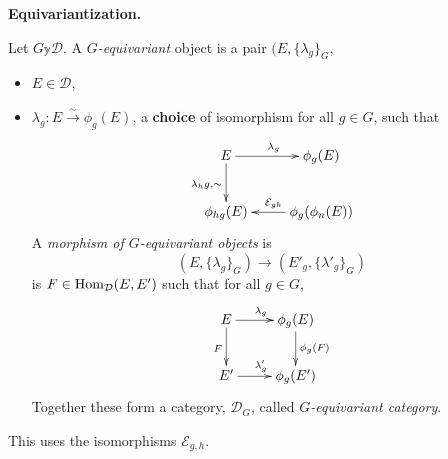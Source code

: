 \medskip\noindent
{\bf Equivariantization.}

\begin{definition}
\label{definition-G-equivariant-object}
Let $G \mathbb{y}\mathcal{D}$. A {\it
$G$-equivariant} object is a pair
$(E,\{\lambda_g\}_G$,
\begin{itemize}
\item $E \in \mathcal{D}$,
\item $\lambda_g:E
\xrightarrow{\sim}\phi_g(E)$, a {\bf choice}
of isomorphism
for all $g\in G$, such that
$$
\xymatrix{
E\ar[r]^{\lambda_g}\ar[d]_{\lambda_hg,\sim}&
\phi_g(E)\\
\phi_{hg}(E)&\phi_g(\phi_n(E))\ar[l]
_{\mathcal{E}_{gh}}
}
$$
A {\it morphism of $G$-equivariant objects}
is
$$
(E,\{\lambda_g\}_G)\to(E'_g,\{\lambda'_g\}_G)
$$
is $F \in \mathop{\mathrm{Hom}}\nolimits_\mathcal{D}(E,E')$ such that
for all $g \in G$,
$$
\xymatrix{
E\ar[d]_F\ar[r]^{\lambda_g}&\phi_g(E)\ar[d]
^{\phi_g(F)}\\
E'\ar[r]^{\lambda'_g}&\phi_g(E')
}
$$
Together these form a category,
$\mathcal{D}_G$, called {\it $G$-equivariant
category}.
\end{itemize}
\end{definition}

\begin{remark}
\label{remark-uses-isomorphisms-Egh}
This uses the isomorphisms
$\mathcal{E}_{g,h}$.
\end{remark}

